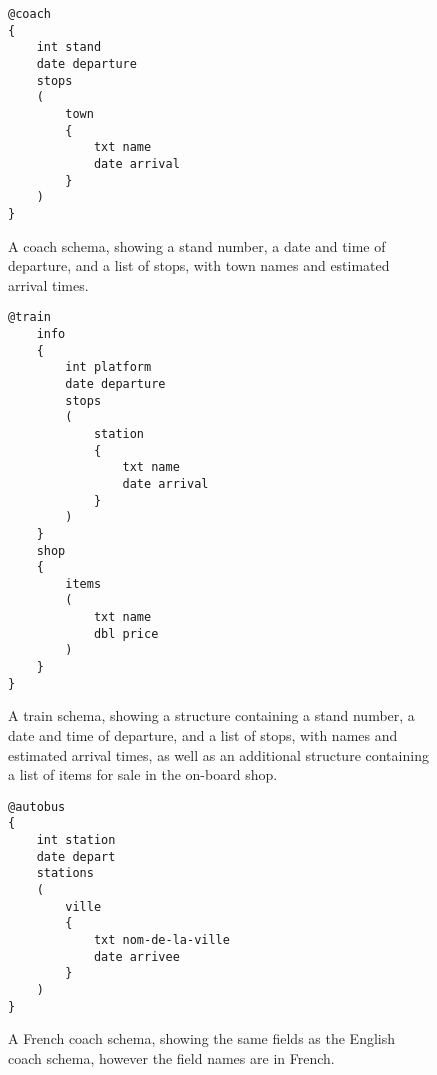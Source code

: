 \begin{figure}[h]
\begin{lstlisting}
@coach
{
    int stand
    date departure
    stops
    (
    	town
    	{
    		txt name
    		date arrival
    	}
    )
}
\end{lstlisting}
\caption[Example schema for a coach]{A coach schema, showing a stand number, a date and time of departure, and a list of stops, with town names and estimated arrival times.}
\label{fig:coach-schema}
\end{figure}

\begin{figure}[h]
\begin{lstlisting}
@train
	info
	{
		int platform
		date departure
		stops
		(
			station
			{
				txt name
				date arrival
			}
		)
	}
	shop
	{
		items
		(
			txt name
			dbl price
		)
	}
}
\end{lstlisting}
\caption[Example schema for a train]{A train schema, showing a structure containing a stand number, a date and time of departure, and a list of stops, with names and estimated arrival times, as well as an additional structure containing a list of items for sale in the on-board shop.}
\label{fig:train-schema}
\end{figure}


\begin{figure}[h]
\begin{lstlisting}
@autobus
{
    int station
    date depart
    stations
    (
    	ville
    	{
    		txt nom-de-la-ville
    		date arrivee
    	}
    )
}
\end{lstlisting}
\caption[Example schema for a French coach]{A French coach schema, showing the same fields as the English coach schema, however the field names are in French.}
\label{fig:french-coach-schema}
\end{figure}
